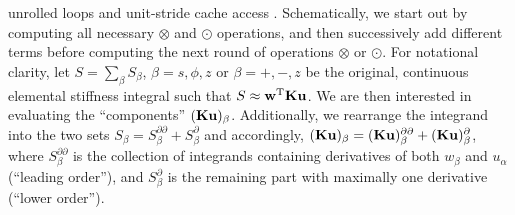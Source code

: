 \documentclass[11pt,letter,fleqn,english,notitlepage]{article}
\newcommand{\bu}{\mbox{${\bf u}$}} \newcommand{\bv}{\mbox{${\bf v}$}}
\newcommand{\bK}{\mbox{${\bf K}$}} \newcommand{\bS}{\mbox{${\bf S}$}}
\begin{document}
unrolled loops and unit-stride cache access \citep{dfm}. 
Schematically, we start out by computing all necessary $\otimes$ and $\odot$ 
operations, and then successively add different terms before 
computing the next round of operations $\otimes$ or $\odot$. 
%
For notational clarity, let $S=\sum_\beta S_\beta$, $\beta=s,\phi,z$ 
or $\beta=+,-,z$ be the original, continuous elemental stiffness integral 
such that $S\approx\bw^{\rm{T}} \bK \bu$. We are then interested in evaluating 
the ``components'' $(\bK\bu)_\beta$. Additionally, we rearrange the integrand 
into the two sets
$S_\beta=S_{\beta}^{\partial\partial}+S_{\beta}^{\partial}$ and accordingly, 
$(\bK\bu)_\beta=(\bK\bu)_\beta^{\partial\partial}+(\bK\bu)_\beta^{\partial}$,
where $S_{\beta}^{\partial\partial}$ is the collection of integrands 
containing derivatives of both $w_\beta$ and $u_\alpha$ (``leading order''), 
and $S_{\beta}^{\partial}$ is the remaining part with maximally one derivative
 (``lower order'').
%
%
\end{document}
